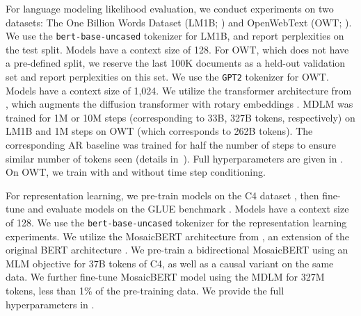 \documentclass{article} %
\def\algo{MDLM}
\def\owt{OWT}
\begin{document}
For language modeling likelihood evaluation, we conduct experiments on two datasets: The One Billion Words Dataset (LM1B; \citep{chelba2014billion}) and OpenWebText (OWT; \citep{Gokaslan2019OpenWeb}).
We use the \texttt{bert-base-uncased} tokenizer for LM1B,
and report perplexities on the test split. Models have a context size of 128.
For OWT, which does not have a pre-defined split, we reserve the last 100K documents as a held-out validation set and report perplexities on this set.
We use the \texttt{GPT2} tokenizer
\citep{radford2019language} for \owt{}.
Models have a context size of 1,024.
We utilize the transformer architecture from \citet{lou2023discrete}, which augments the diffusion transformer \citep{peebles2023scalable} with rotary embeddings \citep{su2021roformer}.
\algo{} was trained for 1M or 10M steps (corresponding to 33B, 327B tokens, respectively) on LM1B and 1M steps on OWT (which corresponds to 262B tokens). The corresponding AR baseline was trained for half the number of steps to ensure similar number of tokens seen (details in~).
Full hyperparameters are given in .
On \owt{}, we train with and without time step conditioning.

For representation learning, we pre-train models on the C4 dataset \citep{t5}, then fine-tune and evaluate models on the GLUE benchmark \citep{wang2018glue}.
Models have a context size of 128.
We use the \texttt{bert-base-uncased} tokenizer
for the representation learning experiments.
We utilize the MosaicBERT architecture from \citet{portes2024mosaicbert}, an extension of the original BERT architecture \citep{devlin2018bert}.
We pre-train a bidirectional MosaicBERT using an MLM objective for 37B tokens of C4, as well as a causal variant on the same data.
We further fine-tune MosaicBERT model using the \algo{} for 327M tokens, less than 1\% of the pre-training data.
We provide the full hyperparameters in .
\end{document}
